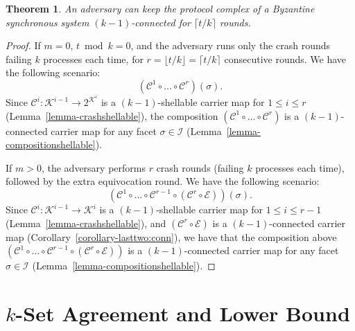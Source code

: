 \documentclass[11pt]{article}
\newcommand{\cC}{\ensuremath{\mathcal{C}}}
\newcommand{\cE}{\ensuremath{\mathcal{E}}}
\newcommand{\cI}{\ensuremath{\mathcal{I}}}
\newcommand{\cK}{\ensuremath{\mathcal{K}}}
\newtheorem{theorem}{Theorem}[section]
\begin{document}
\begin{theorem}
An adversary can keep the protocol complex of a Byzantine synchronous system $(k - 1)$-connected
for $\lceil t/k \rceil$ rounds.
\end{theorem}
\begin{proof}
If $m = 0$,
$t \bmod k = 0$,
and the adversary runs only the crash rounds failing $k$ processes each time,
for $r = \lfloor t/k \rfloor = \lceil t/k \rceil$ consecutive rounds.
We have the following scenario:
\begin{displaymath}
(\cC^1 \circ \ldots \circ \cC^r)(\sigma) \mathrm{.}
\end{displaymath}
Since $\cC^i: \cK^{i-1} \to 2^{\cK^i}$ is a $(k - 1)$-shellable carrier map
for $1 \le i \le r$ (Lemma~\ref{lemma-crashshellable}),
the composition $(\cC^1 \circ \ldots \circ \cC^r)$
is a $(k - 1)$-connected carrier map for any facet $\sigma \in \cI$
(Lemma~\ref{lemma-compositionshellable}).

If $m > 0$,
the adversary performs $r$ crash rounds (failing $k$ processes each time),
followed by the extra equivocation round.
We have the following scenario:
\begin{equation}
\label{equation-equivrun}
(\cC^1 \circ \ldots \circ \cC^{r-1} \circ (\cC^r \circ \cE))(\sigma)
\mathrm{.}
\end{equation}
Since $\cC^i: \cK^{i-1} \to \cK^i$ is a $(k - 1)$-shellable carrier map
for $1 \le i \le r - 1$ (Lemma~\ref{lemma-crashshellable}),
and $(\cC^r \circ \cE)$ is a $(k - 1)$-connected carrier map
(Corollary~\ref{corollary-lasttwo:conn}),
we have that the composition above $(\cC^1 \circ \ldots \circ \cC^{r-1} \circ (\cC^r \circ \cE))$
is a $(k - 1)$-connected carrier map for any facet $\sigma \in \cI$
(Lemma~\ref{lemma-compositionshellable}).
\end{proof}

\section{$k$-Set Agreement and Lower Bound}
\label{Sec-KSetLowerBound}
\end{document}
